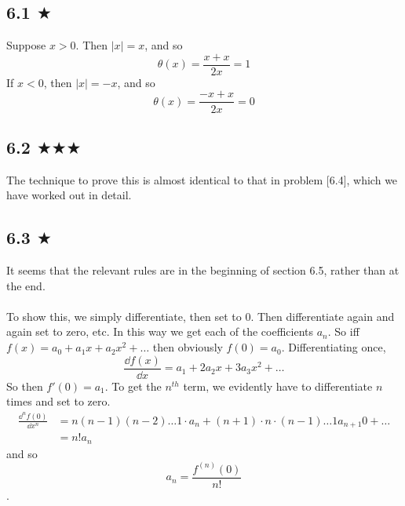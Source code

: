 
\subsection{6.1 $\bigstar$}
Suppose $x>0$. Then $|x|=x$, and so
$$\theta(x)=\frac{x+x}{2x}=1$$
If $x<0$, then $|x|=-x$, and so
$$\theta(x)=\frac{-x+x}{2x}=0$$


\subsection{6.2 $\bigstar \bigstar \bigstar$}
The technique to prove this is almost identical to that in problem [6.4], which we have worked out in detail.


\subsection{6.3 $\bigstar$}
It seems that the relevant rules are in the beginning of section 6.5, rather than at the end. \\ \\ To show this, we simply differentiate, then set to 0. Then differentiate again and again set to zero, etc. In this way we get each of the coefficients $a_n$. So iff $f(x)=a_0+a_1 x+a_2 x^2+\ldots$ then obviously $f(0)=a_0$. Differentiating once, 
$$\frac{\dd f(x)}{\dd x}=a_1+2a_2 x+3a_3 x^2+\ldots$$
So then $f'(0)=a_1$. To get the $n^{th}$ term, we evidently have to differentiate $n$ times and set to zero.
\begin{align*}\frac{\dd^n f(0)}{\dd x^n}&=n(n-1)(n-2)\ldots 1\cdot a_n+(n+1)\cdot n \cdot(n-1)\ldots 1 a_{n+1}0+ \ldots\\
&=n!a_n
\end{align*}
and so $$a_n=\frac{f^{(n)}(0)}{n!}$$.



